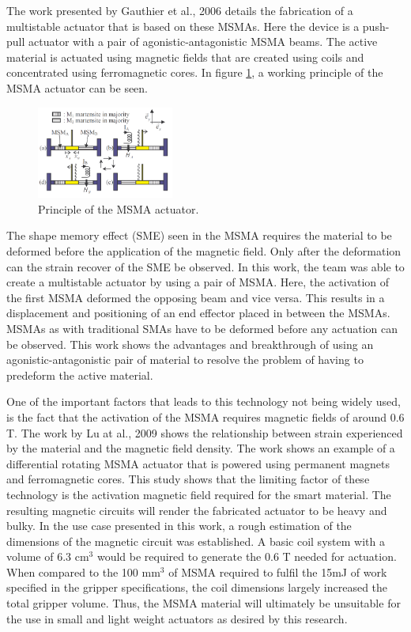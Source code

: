 The work presented by Gauthier et al., 2006\cite{gauthier_multistable_2006} details the fabrication of a multistable actuator that is based on these MSMAs. Here the device is a push-pull actuator with a pair of agonistic-antagonistic MSMA beams. The active material is actuated using magnetic fields that are created using coils and concentrated using ferromagnetic cores. In figure \ref{fig:MSMA_princ}, a working principle of the MSMA actuator can be seen.

\begin{figure}
	\centering
	\vspace{-15pt}
	\includegraphics[width=0.4\textwidth]{Figures/MSMA_princ.png}
	\caption{Principle of the MSMA actuator\cite{gauthier_multistable_2006}.}
	\vspace{-10pt}
	\label{fig:MSMA_princ}
\end{figure}
The shape memory effect (SME) seen in the MSMA requires the material to be deformed before the application of the magnetic field. Only after the deformation can the strain recover of the SME be observed. In this work, the team was able to create a multistable actuator by using a pair of MSMA. Here, the activation of the first MSMA deformed the opposing beam and vice versa. This results in a displacement and positioning of an end effector placed in between the MSMAs. MSMAs as with traditional SMAs have to be deformed before any actuation can be observed. This work shows the advantages and breakthrough of using an agonistic-antagonistic pair of material to resolve the problem of having to predeform the active material.

One of the important factors that leads to this technology not being widely used, is the fact that the activation of the MSMA requires magnetic fields of around 0.6 T. The work by Lu at al., 2009\cite{lu_optimal_2009} shows the relationship between strain experienced by the material and the magnetic field density. The work shows an example of a differential rotating MSMA actuator that is powered using permanent magnets and ferromagnetic cores. This study shows that the limiting factor of these technology is the activation magnetic field required for the smart material. The resulting magnetic circuits will render the fabricated actuator to be heavy and bulky. In the use case presented in this work, a rough estimation of the dimensions of the magnetic circuit was established. A basic coil system with a volume of 6.3 cm$^3$ would be required to generate the 0.6 T needed for actuation. When compared to the 100 mm$^3$ of MSMA required to fulfil the 15mJ of work specified in the gripper specifications, the coil dimensions largely increased the total gripper volume. Thus, the MSMA material will ultimately be unsuitable for the use in small and light weight actuators as desired by this research.

